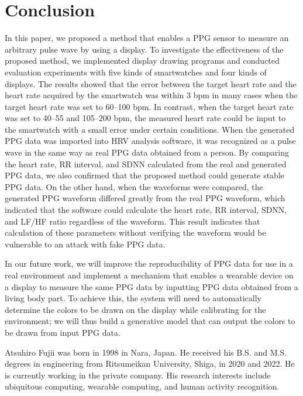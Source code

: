 \documentclass{ieeeaccess}
\begin{document}
\section{Conclusion}
\label{sec:conclusion}
In this paper, we proposed a method that enables a PPG sensor to measure an arbitrary pulse wave by using a display. To investigate the effectiveness of the proposed method, we implemented display drawing programs and conducted evaluation experiments with five kinds of smartwatches and four kinds of displays. The results showed that the error between the target heart rate and the heart rate acquired by the smartwatch was within $3$ bpm in many cases when the target heart rate was set to 60--100 bpm. In contrast, when the target heart rate was set to 40--55 and 105--200 bpm, the measured heart rate could be input to the smartwatch with a small error under certain conditions. When the generated PPG data was imported into HRV analysis software, it was recognized as a pulse wave in the same way as real PPG data obtained from a person. By comparing the heart rate, RR interval, and SDNN calculated from the real and generated PPG data, we also confirmed that the proposed method could generate stable PPG data. On the other hand, when the waveforms were compared, the generated PPG waveform differed greatly from the real PPG waveform, which indicated that the software could calculate the heart rate, RR interval, SDNN, and LF/HF ratio regardless of the waveform. This result indicates that calculation of these parameters without verifying the waveform would be vulnerable to an attack with fake PPG data.\par

In our future work, we will improve the reproducibility of PPG data for use in a real environment and implement a mechanism that enables a wearable device on a display to measure the same PPG data by inputting PPG data obtained from a living body part. To achieve this, the system will need to automatically determine the colors to be drawn on the display while calibrating for the environment; we will thus build a generative model that can output the colors to be drawn from input PPG data.




 \begin{IEEEbiography}{Atsuhiro Fujii} was born in 1998 in Nara, Japan. He received his B.S. and M.S. degrees in engineering from Ritsumeikan University, Shiga, in 2020 and 2022. He is currently working in the private company. His research interests include ubiquitous computing, wearable computing, and human activity recognition.
 \end{IEEEbiography}
\end{document}
